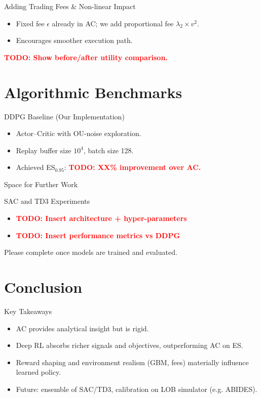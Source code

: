 \documentclass[11pt]{beamer}
\newcommand{\todo}[1]{\textcolor{red}{\bf TODO: #1}}
\begin{document}
	\begin{frame}{Adding Trading Fees \& Non-linear Impact}
		\begin{itemize}
			\item Fixed fee $\epsilon$ already in AC; we add proportional fee $\lambda_2 \times v^2$.
			\item Encourages smoother execution path.
		\end{itemize}
		\todo{Show before/after utility comparison.}
	\end{frame}
	
	\section{Algorithmic Benchmarks}
	
	\begin{frame}{DDPG Baseline (Our Implementation)}
		\begin{itemize}
			\item Actor–Critic with OU-noise exploration.
			\item Replay buffer size $10^4$, batch size 128.
			\item Achieved ES$_{0.95}$: \todo{XX\% improvement over AC.}
		\end{itemize}
	\end{frame}
	
	\begin{frame}{Space for Further Work}
		\begin{block}{SAC and TD3 Experiments}
			\begin{itemize}
				\item \todo{Insert architecture + hyper-parameters}
				\item \todo{Insert performance metrics vs DDPG}
			\end{itemize}
		\end{block}
		\vspace{0.5em}
		Please complete once models are trained and evaluated.
	\end{frame}
	
	\section{Conclusion}
	
	\begin{frame}{Key Takeaways}
		\begin{itemize}
			\item AC provides analytical insight but is rigid.
			\item Deep RL absorbs richer signals and objectives, outperforming AC on ES.
			\item Reward shaping and environment realism (GBM, fees) materially influence learned policy.
			\item Future: ensemble of SAC/TD3, calibration on LOB simulator (e.g. ABIDES).
		\end{itemize}
	\end{frame}
	
\end{document}
